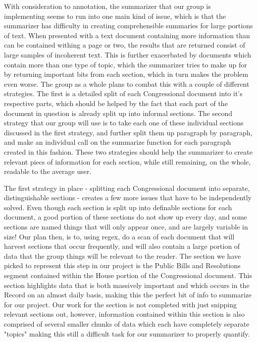 \documentclass[11pt,a4paper]{article}
\begin{document}
With consideration to annotation, the summarizer that our group is implementing seems to run into one main kind of issue, which is that the summarizer has difficulty in creating comprehensible summaries for large portions of text.  When presented with a text document containing more information than can be contained withing a page or two, the results that are returned consist of large samples of incoherent text.  This is further exacerbated by documents which contain more than one type of topic, which the summarizer tries to make up for by returning important bits from each section, which in turn makes the problem even worse.  The group as a whole plans to combat this with a couple of different strategies.  The first is a detailed split of each Congressional document into it's respective parts, which should be helped by the fact that each part of the document in question is already split up into informal sections.  The second strategy that our group will use is to take each one of these individual sections discussed in the first strategy, and further split them up paragraph by paragraph, and make an individual call on the summarize function for each paragraph created in this fashion.  These two strategies should help the summarizer to create relevant piecs of information for each section, while still remaining, on the whole, readable to the average user.

	The first strategy in place - splitting each Congressional document into separate, distinguishable sections - creates a few more issues that have to be independently solved.  Even though each section is split up into definable sections for each document, a good portion of these sections do not show up every day, and some sections are named things that will only appear once, and are largely variable in size!  Our plan then, is to, using regex, do a scan of each document that will harvest sections that occur frequently, and will also contain a large portion of data that the group things will be relevant to the reader.  The section we have picked to represent this step in our project is the Public Bills and Resolutions segment contained within the House portion of the Congressional document.  This section highlights data that is both massively important and which occurs in the Record on an almost daily basis, making this the perfect bit of info to summarize for our project.  Our work for the section is not completed  with just snipping relevant sections out, however, information contained within this section is also comprised of several smaller chunks of data which each have completely separate "topics" making this still a difficult task for our summarizer to properly quantify.
\end{document}

